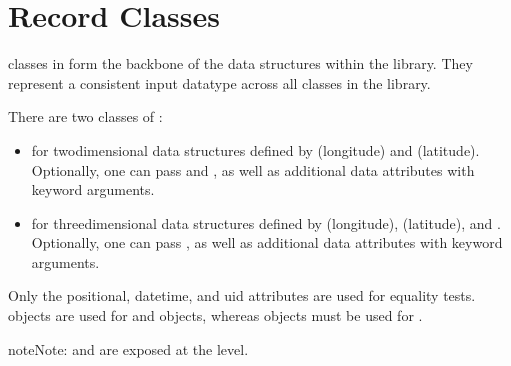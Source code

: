 \documentclass[letterpaper,10pt,english]{sphinxmanual}
\begin{document}
\sphinxstepscope


\chapter{Record Classes}
\label{\detokenize{record:record-classes}}\label{\detokenize{record::doc}}
\sphinxAtStartPar
{} classes in  form the back\sphinxhyphen{}bone of the data structures within the library. They represent a
consistent input data\sphinxhyphen{}type across all classes in the library.

\sphinxAtStartPar
There are two classes of :
\begin{itemize}
\item {}
\sphinxAtStartPar
{} for two\sphinxhyphen{}dimensional data structures defined by  (longitude) and 
(latitude). Optionally, one can pass  and , as well as additional data attributes with keyword
arguments.

\item {}
\sphinxAtStartPar
{} for three\sphinxhyphen{}dimensional data structures defined by  (longitude),
 (latitude), and . Optionally, one can pass , as well as additional data attributes with
keyword arguments.

\end{itemize}

\sphinxAtStartPar
Only the positional, datetime, and uid attributes are used for equality tests.  objects are used for
 and  objects, whereas  objects must be used for .

\begin{sphinxadmonition}{note}{Note:}
\sphinxAtStartPar
{} and  are exposed at the  level.
\end{sphinxadmonition}
\end{document}
